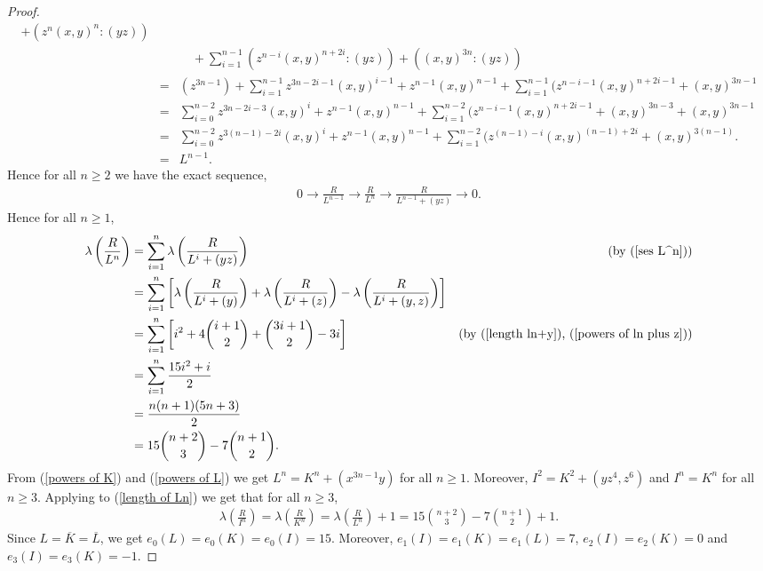 \documentclass[reqno,a4paper,dvipsnames]{amsart}
\theoremstyle{definition}
\begin{document}
\begin{proof}
\begin{eqnarray}
     +  (z^n (x,y)^n : (yz))\\ \nonumber
     & &\quad
     + \sum_{i=1}^{n-1} (z^{n-i} (x,y)^{n+2i}  :(yz))
     + ((x,y)^{3n} :(yz)) \\ \nonumber
     &=& (z^{3n-1}) +  \sum_{i=1}^{n-1} z^{3n-2i-1} (x,y)^{i-1}
     + z^{n-1} (x,y)^{n-1}
     + \sum_{i=1}^{n-1} (z^{n-i-1} (x,y)^{n+2i-1} 
     + (x,y)^{3n-1}\\ \nonumber
     &=&  \sum_{i=0}^{n-2} z^{3n-2i-3} (x,y)^{i}
    + z^{n-1} (x,y)^{n-1}
    + \sum_{i=1}^{n-2} (z^{n-i-1} (x,y)^{n+2i-1}  + (x,y)^{3n-3}   + (x,y)^{3n-1}\\ \nonumber
    &=& \sum_{i=0}^{n-2} z^{3(n-1)-2i} (x,y)^{i}
    + z^{n-1} (x,y)^{n-1}
    + \sum_{i=1}^{n-2} (z^{(n-1)-i} (x,y)^{(n-1)+2i}  
    +  (x,y)^{3(n-1)}. \\ \nonumber
     &=& L^{n-1}.
 \end{eqnarray}
 Hence for all $n \geq 2$ we have the exact sequence,
\begin{eqnarray}
\label{ses L^n}
    0 \longrightarrow \frac{R}{L^{n-1}}
    \longrightarrow \frac{R}{L^{n}}
    \longrightarrow \frac{R}{L^{n-1} + (yz)}
    \longrightarrow 0.
\end{eqnarray} 
Hence for all $n \geq 1$,  
\begin{align}
\label{length of Ln} \nonumber
\lambda \left( \frac{R}{L^{n}} \right) 
&= \sum_{i=1}^n  \lambda \left( \frac{R}{L^{i} + (yz)} \right) & \mbox{(by (\ref{ses L^n}))}\\ \nonumber
&=\sum_{i=1}^n  \left[ \lambda \left( \frac{R}{L^{i} + (y)} \right) 
+   \lambda \left( \frac{R}{L^{i} + (z)} \right)
-  \lambda \left( \frac{R}{L^{i} + (y,z)} \right)\right]&\\ \nonumber
&= \sum_{i=1}^n \left[ i^2 + 4 \binom{i+1}{2} 
+ \binom {3i+1}{ 2 } -3i \right]  & \mbox{(by (\ref{length ln+y}), (\ref{powers of ln plus z}))}  \\ \nonumber
&= \sum_{i=1}^n \frac{15 i^2 + i}{2}& \\ \nonumber
&= \frac{n (n+1) (5n+3)}{2} & \\
& =  15 \binom{n+2}{3} - 7 \binom{n+1}{2}.  
   \end{align}
 From (\ref{powers of K}) and (\ref{powers of L}) we get $L^n= K^n + (x^{3n-1}y)$ for all $n \geq 1$. 
Moreover,  $I^2 = K^2 + (yz^4, z^6)$ and $I^n = K^n$ for all $n\geq 3$. Applying to (\ref{length of Ln}) we get that for all $n \geq 3$, 
\begin{align*}
 \lambda \left(  \frac {R}{I^n}\right)
= \lambda \left(  \frac {R}{K^n}\right)
= \lambda \left(  \frac {R}{L^n}\right)+1
 =  15 \binom{n+2}{3} - 7 \binom{n+1}{2} +1.   
  \end{align*}
  Since $L = \overline{K} = \overline{L}$, we get $e_0(L)= e_0(K) = e_0(I) =15$. Moreover, 
   $e_1(I) =e_1(K) = e_1(L) = 7$,  $e_2(I)=e_2(K)=0$ and $e_3(I) = e_3(K)=-1$. 


\end{proof}
\end{document}
